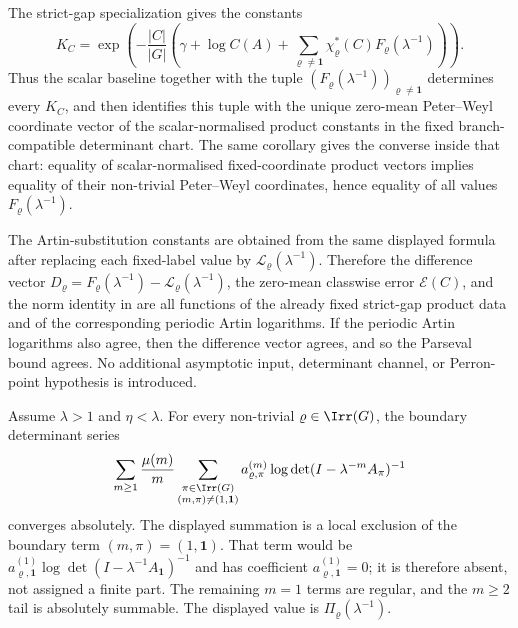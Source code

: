 The strict-gap specialization  gives the
constants
  \[
    K_C=
    \exp\!\left(-\frac{|C|}{|G|}
      \left(\gamma+\log C(A)+
      \sum_{\varrho\ne\mathbf1}\chi_\varrho^\ast(C)
        F_\varrho(\lambda^{-1})\right)\right).
  \]
  Thus the scalar baseline together with the tuple
  \((F_\varrho(\lambda^{-1}))_{\varrho\ne\mathbf1}\) determines every
  \(K_C\), and  then
  identifies this tuple with the unique zero-mean Peter--Weyl coordinate
  vector of the scalar-normalised product constants in the fixed
  branch-compatible determinant chart.  The same corollary gives the converse
  inside that chart: equality of scalar-normalised fixed-coordinate product
  vectors implies
  equality of their non-trivial Peter--Weyl coordinates, hence equality of all
  values \(F_\varrho(\lambda^{-1})\).

  The Artin-substitution constants are obtained from the same displayed
  formula after replacing each fixed-label value by
  \(\mathcal L_\varrho(\lambda^{-1})\).  Therefore the difference vector
  \(D_\varrho=F_\varrho(\lambda^{-1})-
  \mathcal L_\varrho(\lambda^{-1})\), the zero-mean classwise error
  \(\mathcal E(C)\), and the norm identity in
   are all functions of the already fixed
  strict-gap product data and of the corresponding periodic Artin logarithms.
If the periodic Artin logarithms also agree, then the difference vector agrees,
and so the Parseval bound agrees.  No additional asymptotic input, determinant
channel, or Perron-point hypothesis is introduced.

\begin{lemma}
  \label{lem:fixed-label-perron-determinant-evaluation}
  \label{lem:perron-boundary-determinant-evaluation}
  Assume \(\lambda>1\) and \(\eta<\lambda\). For every non-trivial
  \(\varrho\in\Irr(G)\), the boundary determinant series
  \[
    \sum_{m\ge 1}\frac{\mu(m)}{m}
      \sum_{\substack{\pi\in\Irr(G)\\(m,\pi)\neq(1,\mathbf 1)}}
        a_{\varrho,\pi}^{(m)}
        \log\det(I-\lambda^{-m}A_\pi)^{-1}
  \]
  converges absolutely. The displayed summation is a local exclusion of
  the boundary term \((m,\pi)=(1,\mathbf1)\). That term would be
  \(a_{\varrho,\mathbf 1}^{(1)}
  \log\det(I-\lambda^{-1}A_{\mathbf1})^{-1}\) and has coefficient
  \(a_{\varrho,\mathbf 1}^{(1)}=0\); it is therefore absent, not assigned
  a finite part. The remaining \(m=1\) terms are regular, and the
  \(m\ge2\) tail is absolutely summable. The displayed value is
  \(\Pi_\varrho(\lambda^{-1})\).
\end{lemma}

